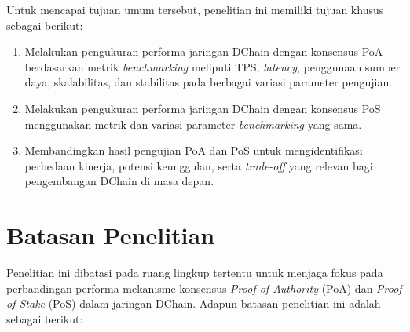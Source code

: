 Untuk mencapai tujuan umum tersebut, penelitian ini memiliki tujuan khusus sebagai berikut:

\begin{enumerate}
    \item Melakukan pengukuran performa jaringan DChain dengan konsensus PoA berdasarkan metrik \textit{benchmarking} meliputi TPS, \textit{latency}, penggunaan sumber daya, skalabilitas, dan stabilitas pada berbagai variasi parameter pengujian.
    \item Melakukan pengukuran performa jaringan DChain dengan konsensus PoS menggunakan metrik dan variasi parameter \textit{benchmarking} yang sama.
    \item Membandingkan hasil pengujian PoA dan PoS untuk mengidentifikasi perbedaan kinerja, potensi keunggulan, serta \textit{trade-off} yang relevan bagi pengembangan DChain di masa depan.
\end{enumerate}

\section{Batasan Penelitian}

Penelitian ini dibatasi pada ruang lingkup tertentu untuk menjaga fokus pada perbandingan performa mekanisme konsensus \textit{Proof of Authority} (PoA) dan \textit{Proof of Stake} (PoS) dalam jaringan DChain. Adapun batasan penelitian ini adalah sebagai berikut:


